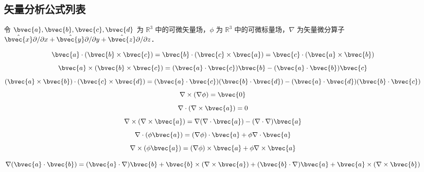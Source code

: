 
\begin{issues}
\end{issues}

\subsection{矢量分析公式列表}

令 $\bvec{a}, \bvec{b}, \bvec{c}, \bvec{d}$ 为 $\mathbb{R}^3$ 中的可微矢量场，$\phi$ 为 $\mathbb{R}^3$ 中的可微标量场，$\nabla$ 为矢量微分算子 $\hat{\bvec{x}}\partial/\partial{x}+\hat{\bvec{y}}\partial/\partial{y}+\hat{\bvec{z}}\partial/\partial{z}$．

\begin{equation}
\bvec{a}\cdot(\bvec{b}\times\bvec{c})=\bvec{b}\cdot(\bvec{c}\times\bvec{a})=\bvec{c}\cdot(\bvec{a}\times\bvec{b})
\end{equation}
\begin{equation}
\bvec{a}\times(\bvec{b}\times\bvec{c})=(\bvec{a}\cdot\bvec{c})\bvec{b}-(\bvec{a}\cdot\bvec{b})\bvec{c}
\end{equation}
\begin{equation}
(\bvec{a}\times\bvec{b})\cdot(\bvec{c}\times\bvec{d})=(\bvec{a}\cdot\bvec{c})(\bvec{b}\cdot\bvec{d})-(\bvec{a}\cdot\bvec{d})(\bvec{b}\cdot\bvec{c})
\end{equation}
\begin{equation}
\nabla\times(\nabla\phi)=\bvec{0}
\end{equation}
\begin{equation}
\nabla\cdot(\nabla\times\bvec{a})=0
\end{equation}
\begin{equation}
\nabla\times(\nabla\times\bvec{a})=\nabla(\nabla\cdot\bvec{a})-(\nabla\cdot\nabla)\bvec{a}
\end{equation}
\begin{equation}
\nabla\cdot(\phi\bvec{a})=(\nabla\phi)\cdot\bvec{a}+\phi\nabla\cdot\bvec{a}
\end{equation}
\begin{equation}
\nabla\times(\phi\bvec{a})=(\nabla\phi)\times\bvec{a}+\phi\nabla\times\bvec{a}
\end{equation}

\begin{equation}\label{VecAnl_eq15}
\nabla(\bvec{a}\cdot\bvec{b})=(\bvec{a}\cdot\nabla)\bvec{b}+\bvec{b}\times(\nabla\times\bvec{a})+(\bvec{b}\cdot\nabla)\bvec{a}+\bvec{a}\times(\nabla\times\bvec{b})
\end{equation}

